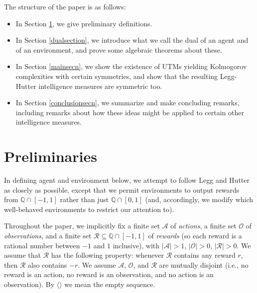 \documentclass[runningheads]{llncs}
\begin{document}

The structure of the paper is as follows:
\begin{itemize}
    \item In Section \ref{prelimsecn}, we give preliminary definitions.
    \item In Section \ref{dualsection}, we introduce what we call the dual of an agent and of
        an environment, and prove some algebraic theorems about these.
    \item In Section \ref{mainsecn}, we show the existence of UTMs yielding Kolmogorov
        complexities with certain symmetries, and show that the resulting Legg-Hutter
        intelligence measures are symmetric too.
    \item In Section \ref{conclusionsecn}, we summarize and make concluding remarks, including
        remarks about how these ideas might be applied to certain other intelligence measures.
\end{itemize}

\section{Preliminaries}
\label{prelimsecn}

In defining agent and environment below, we attempt to follow
Legg and Hutter \cite{legg2007universal} as closely as possible,
except that we permit environments to output rewards from $\mathbb Q \cap [-1,1]$
rather than just $\mathbb Q\cap [0,1]$ (and, accordingly, we modify which well-behaved
environments to restrict our attention to).

Throughout the paper, we implicitly
fix a finite set $\mathcal A$ of \emph{actions},
a finite set $\mathcal O$ of \emph{observations},
and a finite set $\mathcal R\subseteq \mathbb Q\cap [-1,1]$ of \emph{rewards}
(so each reward is a rational number between $-1$ and $1$ inclusive),
with $|\mathcal A|>1$,
$|\mathcal O|>0$, $|\mathcal R|>0$.
We assume that $\mathcal R$ has the following property:
whenever $\mathcal R$ contains any reward $r$, then $\mathcal R$
also contains $-r$.
We assume $\mathcal A$, $\mathcal O$, and $\mathcal R$ are mutually disjoint
(i.e., no reward is an action, no reward is an observation, and no action is an
observation).
By $\langle\rangle$ we mean the empty sequence.
\end{document}
